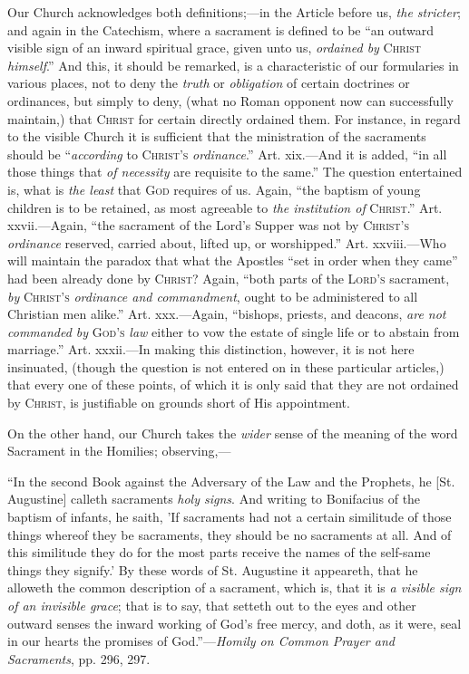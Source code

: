 Our Church acknowledges both definitions;—in the Article before
us, \emph{the stricter}; and again in the Catechism, where a sacrament
is defined to be ``an outward visible sign of an inward spiritual
grace, given unto us, \emph{ordained by} C\textsc{hrist} \emph{himself}.''
And this, it should be remarked, is a characteristic of our
formularies in various places, not to deny the \emph{truth} or \emph{obligation}
of certain doctrines or ordinances, but simply to deny, (what no Roman
opponent now can successfully maintain,) that C\textsc{hrist}
for certain directly ordained them. For instance, in regard to the
visible Church it is sufficient that the ministration of the
sacraments should be ``\emph{according} to C\textsc{hrist's}
\emph{ordinance}.'' Art. xix.—And it is added, ``in all
those things that \emph{of necessity} are requisite to the same.''
The question entertained is, what is \emph{the least} that G\textsc{od}
requires of us. Again, ``the baptism of young children is to be
retained, as most agreeable to \emph{the institution of} C\textsc{hrist}.''
Art. xxvii.—Again, ``the sacrament of the Lord's Supper was not
by C\textsc{hrist's} \emph{ordinance} reserved, carried
about, lifted up, or worshipped.'' Art. xxviii.—Who will
maintain the paradox that what the Apostles ``set in order when
they came'' had been already done by C\textsc{hrist}?
Again, ``both parts of the L\textsc{ord's} sacrament,
\emph{by} C\textsc{hrist's} \emph{ordinance and commandment},
ought to be administered to all Christian men alike.'' Art. xxx.—Again,
``bishops, priests, and deacons, \emph{are not commanded by} G\textsc{od's}
\emph{law} either to vow the estate of single life or to abstain from
marriage.'' Art. xxxii.—In making this distinction, however, it
is not here insinuated, (though the question is not entered on in
these particular articles,) that every one of these points, of which
it is only said that they are not ordained by C\textsc{hrist},
is justifiable on grounds short of His appointment.

On the other hand, our Church takes the \emph{wider} sense of the
meaning of the word Sacrament in the Homilies; observing,—

``In the second Book against the Adversary of
the Law and the Prophets, he [St. Augustine] calleth sacraments \emph{holy
signs}. And writing to Bonifacius of the baptism of infants, he
saith, 'If sacraments had not a certain similitude of those things
whereof they be sacraments, they should be no sacraments at all. And
of this similitude they do for the most parts receive the names
of the self-same things they signify.' By these words of St. Augustine
it appeareth, that he alloweth the common description of a sacrament,
which is, that it is \emph{a visible sign of an invisible grace}; that
is to say, that setteth out to the eyes and other outward senses the
inward working of God's free mercy, and doth, as it were, seal in our
hearts the promises of God.''—\emph{Homily on Common Prayer and
Sacraments}, pp. 296, 297.

